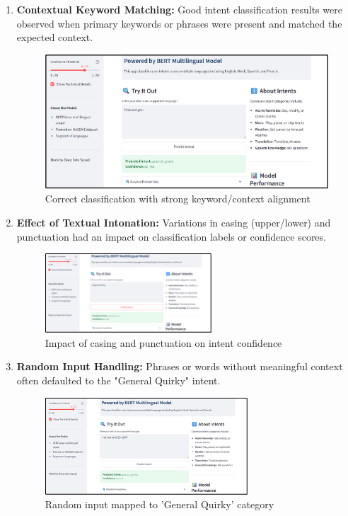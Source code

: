 \documentclass{ecai}
\begin{document}
\begin{enumerate}
    \item \textbf{Contextual Keyword Matching:} Good intent classification results were observed when primary keywords or phrases were present and matched the expected context.
    
    \begin{figure}[H]
    \centering
    \includegraphics[width=0.7\linewidth]{result1.png}
    \caption{Correct classification with strong keyword/context alignment}
    \end{figure}
    
    \item \textbf{Effect of Textual Intonation:} Variations in casing (upper/lower) and punctuation had an impact on classification labels or confidence scores.
    
    \begin{figure}[H]
    \centering
    \includegraphics[width=0.7\linewidth]{result2.png}
    \caption{Impact of casing and punctuation on intent confidence}
    \end{figure}
    
    \item \textbf{Random Input Handling:} Phrases or words without meaningful context often defaulted to the "General Quirky" intent.
    
    \begin{figure}[H]
    \centering
    \includegraphics[width=0.7\linewidth]{result3.png}
    \caption{Random input mapped to 'General Quirky' category}
    \end{figure}
    

\end{enumerate}
\end{document}
